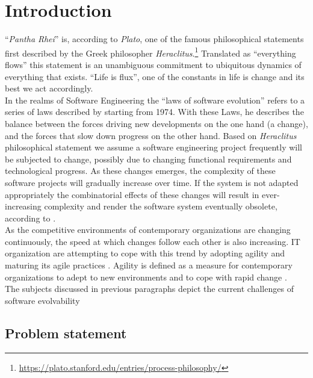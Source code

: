 \chapter{Introduction} \label{introduction}

\enquote{\emph{Pantha Rhei}} is, according to \emph{Plato}, one of the famous
philosophical statements first described by the Greek philosopher
\emph{Heraclitus}.\footnote[1]{\url{https://plato.stanford.edu/entries/process-philosophy/}}
Translated as \enquote{everything flows} this statement is an unambiguous commitment to
ubiquitous dynamics of everything that exists. \enquote{Life is flux}, one of the
constants in life is change and its best we act accordingly.\\

In the realms of Software Engineering the \enquote{laws of software evolution}
\parencite*[]{lehman_programs_1980} refers to a series of laws described by
\citeauthor{lehman_programs_1980} starting from 1974. With these Laws, he describes the
balance between the forces driving new developments on the one hand (a change), and the
forces that slow down progress on the other hand. Based on \emph{Heraclitus} philosophical
statement we assume a software engineering project frequently will be subjected to change,
possibly due to changing functional requirements and technological progress. As these
changes emerges, the complexity of these software projects will gradually increase over
time. If the system is not adapted appropriately the combinatorial effects of these
changes will result in ever-increasing complexity and render the software system
eventually obsolete, according to \citeauthor{lehman_programs_1980}
\parencite*[]{lehman_programs_1980}.\\

As the competitive environments of contemporary organizations are changing continuously,
the speed at which changes follow each other is also increasing. IT organization are
attempting to cope with this trend by adopting agility and maturing its agile practices
\parencite*[]{2024_SIM_key_issues_and_trends}. Agility is defined as a measure for
contemporary organizations to adept to new environments and to cope with rapid change
\parencite*[]{neumann_strategic_1994}.\\

The subjects discussed in previous paragraphs depict the current challenges of software
evolvability

\section{Problem statement} \label{problem_statement}

